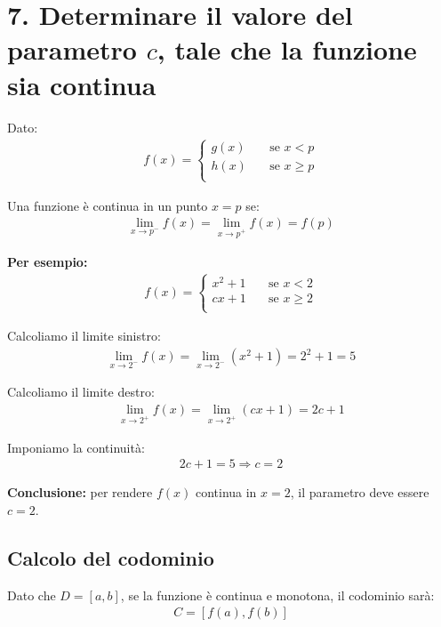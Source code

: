 \documentclass{article}
\begin{document}
\vspace{2em}
\section*{7. Determinare il valore del parametro $c$, tale che la funzione sia continua}
Dato:
\begin{align*}
    f(x) = \begin{cases}
        g(x) \quad &\text{se } x < p \\
        h(x) \quad &\text{se } x \geq p \\
    \end{cases}
\end{align*}

Una funzione è continua in un punto \( x = p \) se:
\begin{align*}
    \lim_{x \to p^-} f(x) = \lim_{x \to p^+} f(x) = f(p)
\end{align*}

\textbf{Per esempio:}
\begin{align*}
    f(x) = \begin{cases}
        x^2 + 1 \quad &\text{se } x < 2 \\
        cx + 1 \quad &\text{se } x \geq 2 \\
    \end{cases}
\end{align*}

Calcoliamo il limite sinistro:
\begin{align*}
    \lim_{x \to 2^-} f(x) = \lim_{x \to 2^-} (x^2 + 1) = 2^2 + 1 = 5
\end{align*}

Calcoliamo il limite destro:
\begin{align*}
    \lim_{x \to 2^+} f(x) = \lim_{x \to 2^+} (cx + 1) = 2c + 1
\end{align*}

Imponiamo la continuità:
\begin{align*}
    2c + 1 = 5 \Rightarrow c = 2
\end{align*}

\textbf{Conclusione:} per rendere \( f(x) \) continua in \( x = 2 \), il parametro deve essere \( c = 2 \).

\subsection*{Calcolo del codominio}
Dato che \( D = [a, b] \), se la funzione è continua e monotona, il codominio sarà:
\begin{align*}
    C = [f(a), f(b)] 
\end{align*}
\end{document}
